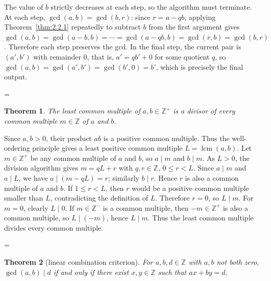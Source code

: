 \documentclass[11pt]{article}
\makeatletter
\theoremstyle{ntstyle}
\newtheorem{theorem}{Theorem}[subsection]
\let\nt@closedisplay\]
\def\nt@guardedclose{\@ifnextchar\par{\nt@closeafterpar}{\@ifnextchar\end{\postdisplaypenalty\@M\nt@closedisplay}{\nt@closedisplay}}}
\def\nt@closeafterpar\par{\@ifnextchar\par{\nt@closeafterpar}{\@ifnextchar\end{\postdisplaypenalty\@M\nt@closedisplay\par}{\nt@closedisplay\par}}}
\renewenvironment{proof}[1][\proofname]{\par
  \pushQED{\qed}\normalfont\topsep\medskipamount\edef\nt@afterproof{\@endparpenalty=\the\@endparpenalty\relax}\@beginparpenalty\@M\@endparpenalty\@M\let\]\nt@guardedclose\trivlist\item[]\textit{#1\@addpunct{.}} \ignorespaces}{\ifvmode\addpenalty\@M\fi\popQED\nt@afterproof\endtrivlist\@endpefalse}
\DeclareMathOperator{\lcm}{lcm}
\makeatother
\begin{document}
\begin{proof} The value of $b$ strictly decreases at each
	step, so the algorithm must terminate. At each step, $\gcd(a, b) = \gcd(b, r)$: since $r = a - qb$, applying
	Theorem~\ref{thm:2.2.1} repeatedly to subtract $b$ from the first argument gives
	$\gcd(a, b) = \gcd(a-b, b) = \cdots = \gcd(a-qb, b) = \gcd(r, b) =
		\gcd(b, r)$. Therefore each step preserves the gcd. In the final step, the current
	pair is $(a', b')$ with remainder $0$, that is, $a' = q b' + 0$ for some
	quotient $q$, so $\gcd(a, b) = \gcd(a', b') = \gcd(b', 0) = b'$,
	which is precisely the final output.

\end{proof}
\begin{theorem}\label{thm:2.2.3} The least common multiple of
	$a,b\in\mathbb{Z}^+$ is a divisor of every common multiple
	$m\in\mathbb{Z}$ of $a$ and $b$.

\end{theorem}

\begin{proof} Since $a,b>0$, their product $ab$ is a positive common multiple.
	Thus the well-ordering principle gives a least positive common multiple
	$L=\lcm(a,b)$. Let $m\in \mathbb{Z}^+$ be any common multiple of $a$
	and $b$, so $a \mid m$ and $b \mid m$. As $L>0$, the division
	algorithm gives $m=qL+r$ with $q,r\in\mathbb{Z}$, $0\le r<L$.
	Since $a\mid m$ and $a\mid L$, we have $a\mid (m-qL)=r$; similarly
	$b\mid r$. Hence $r$ is also a common multiple of $a$ and $b$. If
	$1\le r<L$, then $r$ would be a positive common multiple smaller than
	$L$, contradicting the definition of $L$. Therefore $r=0$, so $L\mid
		m$. For $m=0$, clearly $L\mid 0$. If $m\in\mathbb{Z}^-$ is a common
	multiple, then $-m\in\mathbb{Z}^+$ is also a common multiple, so
	$L\mid (-m)$, hence $L\mid m$. Thus the least common multiple divides every common multiple.

\end{proof}
\begin{theorem}[linear combination criterion]\label{thm:2.2.4} For
	$a, b, d \in \mathbb{Z}$ with $a,b$ not both zero, $\gcd(a, b) \mid d$ if and only
	if there exist $x, y \in \mathbb{Z}$ such that $ax+by=d$.

\end{theorem}
\end{document}
